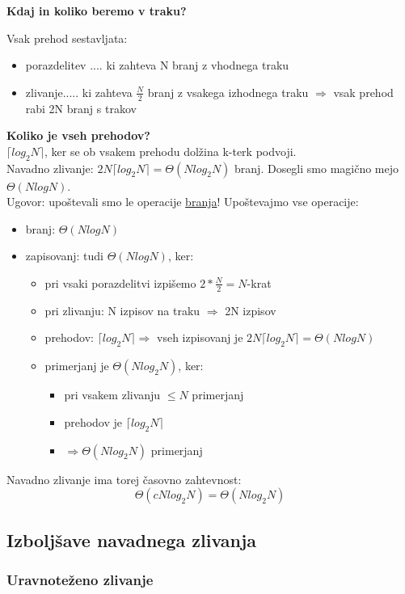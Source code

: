 \documentclass[a4paper,10pt]{article}
\begin{document}
\begin{flushleft}
\textbf{Kdaj in koliko beremo v traku?} \\
\end{flushleft}
Vsak prehod sestavljata:
\begin{itemize}
\item porazdelitev .... ki zahteva N branj z vhodnega traku
\item zlivanje..... ki zahteva $\frac{N}{2}$ branj z vsakega izhodnega traku $\Rightarrow$ vsak prehod rabi 2N branj s trakov
\end{itemize}
\textbf{Koliko je vseh prehodov?} \\
$\lceil log_2 N \rceil$, ker se ob vsakem prehodu dol\v zina k-terk podvoji.\\
Navadno zlivanje: $2N\lceil log_2N\rceil = \Theta (N log_2N)$ branj. Dosegli smo magi\v cno mejo $\Theta (Nlog N)$.\\
Ugovor: upo\v stevali smo le operacije \underline{branja}!
Upo\v stevajmo vse operacije:
\begin{itemize}
\item branj: $\Theta (N log N)$
\item zapisovanj: tudi $\Theta (N log N)$, ker:
	\begin{itemize}
	\item pri vsaki porazdelitvi izpi\v semo $2*\frac{N}{2} = N$-krat
	\item pri zlivanju: N izpisov na traku $\Rightarrow$ 2N izpisov
	\item prehodov: $\lceil log_2N\rceil \Rightarrow$ vseh izpisovanj je $2N \lceil log_2N\rceil = \Theta (N log N)$
	\item primerjanj je $\Theta (N log_2 N)$, ker:
		\begin{itemize}
		\item pri vsakem zlivanju $\leq N$ primerjanj
		\item prehodov je $\lceil log_2N \rceil$
		\item $\Rightarrow \Theta (N log_2 N)$ primerjanj
		\end{itemize}
	\end{itemize}
\end{itemize}
Navadno zlivanje ima torej \v casovno zahtevnost:
$$
\Theta (cNlog_2 N) = \Theta (Nlog_2N)
$$
\subsection{Izbolj\v save navadnega zlivanja}
\subsubsection{Uravnote\v zeno zlivanje}
\end{document}
